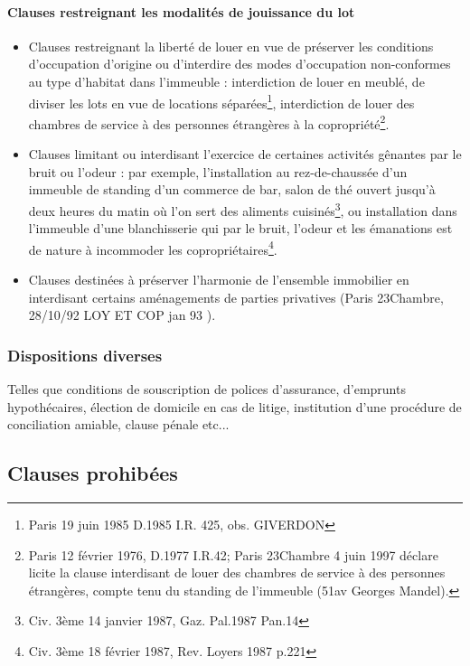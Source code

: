 			\paragraph{Clauses restreignant les modalités de jouissance du lot}
			\begin{itemize}
				\item Clauses restreignant la liberté de louer en vue de préserver les conditions d'occupation d'origine ou d'interdire des modes d'occupation non-conformes au type d'habitat dans l'immeuble : interdiction de louer en meublé, de diviser les lots en vue de locations séparées\footnote{Paris 19 juin 1985 D.1985 I.R. 425, obs. GIVERDON}, interdiction de louer des chambres de service à des personnes étrangères à la copropriété\footnote{Paris 12 février 1976, D.1977 I.R.42; Paris 23\degres Chambre 4 juin 1997 déclare licite la clause interdisant de louer des chambres de service à des personnes étrangères, compte tenu du standing de l’immeuble (51av Georges Mandel).}.
				
				\item Clauses limitant ou interdisant l'exercice de certaines activités gênantes par le bruit ou l'odeur : par exemple, l'installation au rez-de-chaussée d'un immeuble de standing d'un commerce de bar, salon de thé ouvert jusqu'à deux heures du matin où l'on sert des aliments cuisinés\footnote{Civ. 3ème 14 janvier 1987, Gaz. Pal.1987 Pan.14}, ou installation dans l'immeuble d'une blanchisserie qui par le bruit, l'odeur et les émanations est de nature à incommoder les copropriétaires\footnote{Civ. 3ème 18 février 1987, Rev. Loyers 1987 p.221}.
				
				\item Clauses destinées à préserver l'harmonie de l'ensemble immobilier en interdisant certains aménagements de parties privatives (Paris 23\degres Chambre, 28/10/92 LOY ET COP jan 93 ).
			\end{itemize}
		
		\subsubsection{Dispositions diverses}

		Telles que conditions de souscription de polices d'assurance, d'emprunts hypothécaires, élection de domicile en cas de litige, institution d'une procédure de conciliation amiable, clause pénale etc...
	
	\subsection{Clauses prohibées}
	
